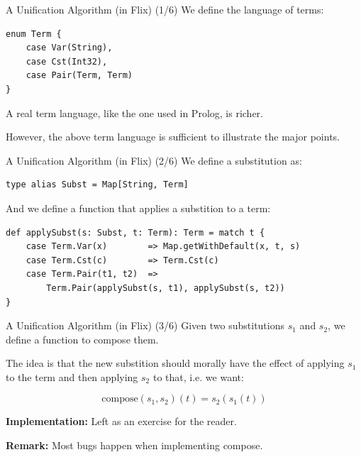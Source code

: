 \begin{frame}[fragile]{A Unification Algorithm (in Flix) (1/6)}
We define the language of terms:

\begin{lstlisting}[language=flix, xleftmargin=0.5cm]
enum Term {
    case Var(String),
    case Cst(Int32),
    case Pair(Term, Term)
}
\end{lstlisting}

A real term language, like the one used in Prolog, is richer.

However, the above term language is sufficient to illustrate the major points. 
\end{frame}

\begin{frame}[fragile]{A Unification Algorithm (in Flix) (2/6)}
We define a substitution as:

\begin{lstlisting}[language=flix, xleftmargin=0.5cm]
type alias Subst = Map[String, Term]
\end{lstlisting}

\pause

And we define a function that applies a substition to a term:

\begin{lstlisting}[language=flix, xleftmargin=0.5cm]
def applySubst(s: Subst, t: Term): Term = match t {
    case Term.Var(x)        => Map.getWithDefault(x, t, s)
    case Term.Cst(c)        => Term.Cst(c)
    case Term.Pair(t1, t2)  => 
        Term.Pair(applySubst(s, t1), applySubst(s, t2))
}
\end{lstlisting}
\end{frame}

\begin{frame}[fragile]{A Unification Algorithm (in Flix) (3/6)}
Given two substitutions $s_1$ and $s_2$, we define a function to compose them.

The idea is that the new substition should morally have the effect of applying
$s_1$ to the term and then applying $s_2$ to that, i.e. we want:

\[
    \text{compose}(s_1, s_2)(t) = s_2(s_1(t))
\]

\textbf{Implementation:} Left as an exercise for the reader.

\textbf{Remark:} Most bugs happen when implementing compose. 
\end{frame}


